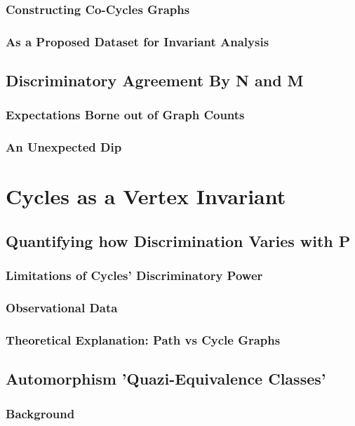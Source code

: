 \documentclass[11pt,a4paper]{report}
\begin{document}
\subsection{Constructing Co-Cycles Graphs}
\subsection{As a Proposed Dataset for Invariant Analysis}

\section{Discriminatory Agreement By N and M}
\subsection{Expectations Borne out of Graph Counts}
\subsection{An Unexpected Dip}



\chapter{Cycles as a Vertex Invariant}

\section{Quantifying how Discrimination Varies with P}
\subsection{Limitations of Cycles' Discriminatory Power}
\subsection{Observational Data}
\subsection{Theoretical Explanation: Path vs Cycle Graphs}

\section{Automorphism 'Quazi-Equivalence Classes'}
\subsection{Background}
\end{document}

